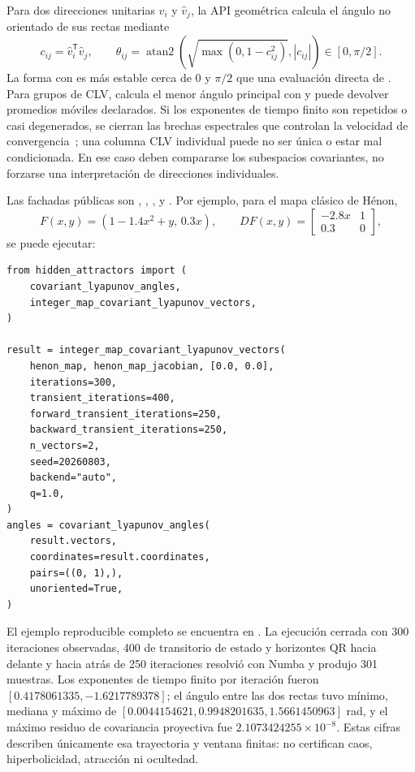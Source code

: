 Para dos direcciones unitarias $\widehat v_i$ y $\widehat v_j$, la API
geométrica calcula el ángulo no orientado de sus rectas mediante
\[
 c_{ij}=\widehat v_i^{\mathsf T}\widehat v_j,
 \qquad
 \theta_{ij}=\operatorname{atan2}
 \left(\sqrt{\max(0,1-c_{ij}^{2})},|c_{ij}|\right)
 \in[0,\pi/2].
\]
La forma con  es más estable cerca de $0$ y $\pi/2$ que una
evaluación directa de . Para grupos de CLV,
 calcula el menor ángulo principal con
 y puede devolver promedios móviles
declarados. Si los exponentes de tiempo finito son repetidos o casi
degenerados, se cierran las brechas espectrales que controlan la velocidad de
convergencia~\cite{Noethen2021CLVHilbert}; una columna CLV individual puede no
ser única o estar mal condicionada. En ese caso deben compararse los
subespacios covariantes, no forzarse una interpretación de direcciones
individuales.

Las fachadas públicas son
,
,
,
 y
. Por ejemplo, para el mapa clásico de
Hénon,
\[
 F(x,y)=(1-1.4x^2+y,\,0.3x),
 \qquad
 DF(x,y)=\begin{bmatrix}-2.8x&1\\0.3&0\end{bmatrix},
\]
se puede ejecutar:
\begin{verbatim}
from hidden_attractors import (
    covariant_lyapunov_angles,
    integer_map_covariant_lyapunov_vectors,
)

result = integer_map_covariant_lyapunov_vectors(
    henon_map, henon_map_jacobian, [0.0, 0.0],
    iterations=300,
    transient_iterations=400,
    forward_transient_iterations=250,
    backward_transient_iterations=250,
    n_vectors=2,
    seed=20260803,
    backend="auto",
    q=1.0,
)
angles = covariant_lyapunov_angles(
    result.vectors,
    coordinates=result.coordinates,
    pairs=((0, 1),),
    unoriented=True,
)
\end{verbatim}
El ejemplo reproducible completo se encuentra en
. La ejecución cerrada con
300 iteraciones observadas, 400 de transitorio de estado y horizontes QR
hacia delante y hacia atrás de 250 iteraciones resolvió
 con Numba y produjo 301 muestras. Los exponentes de
tiempo finito por iteración fueron $[0.4178061335,-1.6217789378]$; el ángulo
entre las dos rectas tuvo mínimo, mediana y máximo de
$[0.0044154621,0.9948201635,1.5661450963]$ rad, y el máximo residuo de
covariancia proyectiva fue $2.1073424255\times10^{-8}$. Estas cifras describen
únicamente esa trayectoria y ventana finitas: no certifican caos,
hiperbolicidad, atracción ni ocultedad.

